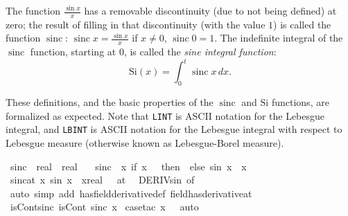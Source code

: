 \documentclass[leqno]{article}
\theoremstyle{definition}
\newcommand\sinc{\mathop{\text{sinc}}\nolimits}
\newcommand\Si{\text{Si}}
\begin{document}
The function $\frac{\sin x}{x}$ has a removable discontinuity (due to not being defined) at zero; the result of filling in that discontinuity (with the value $1$) is called the function $\sinc$: $\sinc x = \frac{\sin x}{x}$ if $x \ne 0$, $\sinc 0 = 1$. The indefinite integral of the $\sinc$ function, starting at $0$, is called the {\em sine integral function}:
\[ \Si(x) = \int_0^t \sinc x \, dx. \]

These definitions, and the basic properties of the $\sinc$ and $\Si$ functions, are formalized as expected. Note that \texttt{LINT} is ASCII notation for the Lebesgue integral, and \texttt{LBINT} is ASCII notation for the Lebesgue integral with respect to Lebesgue measure (otherwise known as Lebesgue-Borel measure).\phantom{)}

\medskip

\begin{isabellebody}
\isamarkupfalse%
\ sinc\ {\isacharcolon}{\isacharcolon}\ {\isachardoublequoteopen}real\ {\isasymRightarrow}\ real{\isachardoublequoteclose}\ \isanewline
\ \ {\isachardoublequoteopen}sinc\ {\isasymequiv}\ {\isacharparenleft}{\isasymlambda}x{\isachardot}\ if\ x\ {\isacharequal}\ {}\ then\ {}\ else\ sin\ x\ {\isacharslash}\ x{\isacharparenright}{\isachardoublequoteclose}\isanewline
\isanewline
{}\isamarkupfalse%
\ sinc{\isacharunderscore}at{\isacharunderscore}{}{\isacharcolon}\ {\isachardoublequoteopen}{\isacharparenleft}{\isacharparenleft}{\isasymlambda}x{\isachardot}\ sin\ x\ {\isacharslash}\ x{\isacharcolon}{\isacharcolon}real{\isacharparenright}\ {\isacharminus}{\isacharminus}{\isacharminus}{\isachargreater}\ {}{\isacharparenright}\ {\isacharparenleft}at\ {}{\isacharparenright}{\isachardoublequoteclose}\isanewline
{}\isamarkupfalse%
\ DERIV{\isacharunderscore}sin\ {\isacharbrackleft}of\ {}{\isacharbrackright}\ \isamarkupfalse%
\ {\isacharparenleft}auto\ simp\ add{\isacharcolon}\ has{\isacharunderscore}field{\isacharunderscore}derivative{\isacharunderscore}def\ field{\isacharunderscore}has{\isacharunderscore}derivative{\isacharunderscore}at{\isacharparenright}%
\isanewline
{}\isamarkupfalse%
\ isCont{\isacharunderscore}sinc{\isacharcolon}\ {\isachardoublequoteopen}isCont\ sinc\ x{\isachardoublequoteclose}\isanewline
{}\isamarkupfalse%
\ {\isacharparenleft}case{\isacharunderscore}tac\ {\isachardoublequoteopen}x\ {\isacharequal}\ {}{\isachardoublequoteclose}{\isacharcomma}\ auto{\isacharparenright}\isanewline

\end{isabellebody}
\end{document}
